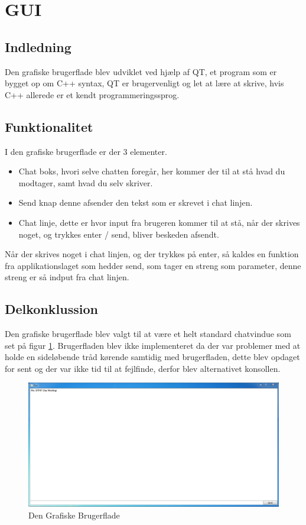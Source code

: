 \section{GUI}

\subsection{Indledning}

Den grafiske brugerflade blev udviklet ved hjælp af QT, et program som er bygget op om C++ syntax, QT er brugervenligt og let at lære at skrive, hvis C++ allerede er et kendt programmeringssprog.\\
\subsection{Funktionalitet}

I den grafiske brugerflade er der 3 elementer.
\begin{itemize}
	\item Chat boks, hvori selve chatten foregår, her kommer der til at stå hvad du modtager, samt hvad du selv skriver.
	\item Send knap denne afsender den tekst som er skrevet i chat linjen.
	\item Chat linje, dette er hvor input fra brugeren kommer til at stå, når der skrives noget, og trykkes enter / send, bliver beskeden afsendt.
\end{itemize}

Når der skrives noget i chat linjen, og der trykkes på enter, så kaldes en funktion fra applikationslaget som hedder send, som tager en streng som parameter, denne streng er så indput fra chat linjen.

\subsection{Delkonklussion}
Den grafiske brugerflade blev valgt til at være et helt standard chatvindue som set på figur \ref{fig:GUI}.
Brugerfladen blev ikke implementeret da der var problemer med at holde en sideløbende tråd kørende samtidig med brugerfladen, dette blev opdaget for sent og der var ikke tid til at fejlfinde, derfor blev alternativet konsollen.




\begin{figure}[h]
\centering
\includegraphics[scale=0.5]{Billeder/GUI.PNG}
\caption{Den Grafiske Brugerflade}
\label{fig:GUI}
\end{figure}